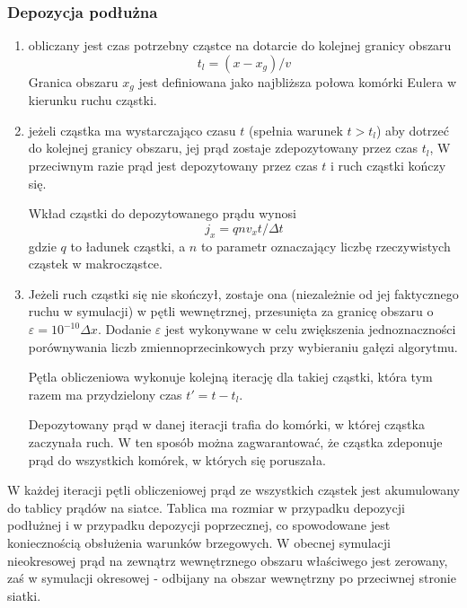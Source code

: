 \subsubsection{Depozycja podłużna} 
\begin{enumerate}
    \item{} obliczany jest czas potrzebny cząstce na dotarcie do kolejnej
    granicy obszaru
    \begin{equation}
        t_l = (x - x_g)/v
    \end{equation}
    Granica obszaru $x_g$ jest definiowana jako najbliższa połowa komórki Eulera w kierunku
    ruchu cząstki.
    \item
    \begin{itemize}
        \itemi{} jeżeli cząstka ma wystarczająco czasu $t$ (spełnia warunek $t > t_l$) aby
        dotrzeć do kolejnej granicy obszaru, jej prąd zostaje zdepozytowany przez czas $t_l$,
        \itemi{} W przeciwnym razie prąd jest depozytowany przez czas $t$ i ruch cząstki kończy się.
    \end{itemize}
    Wkład cząstki do depozytowanego prądu wynosi
    \begin{equation}
        j_x = q n v_x t/\Delta t
    \end{equation}
    gdzie $q$ to ładunek cząstki, a $n$ to parametr  oznaczający liczbę
    rzeczywistych cząstek w makrocząstce.

    \item{} Jeżeli ruch cząstki się nie skończył, zostaje ona (niezależnie od
    jej faktycznego ruchu w symulacji) w pętli wewnętrznej, 
    przesunięta za granicę obszaru o $\varepsilon =
    10^{-10} \Delta x$. Dodanie $\varepsilon$ jest wykonywane w celu zwiększenia
    jednoznaczności porównywania liczb zmiennoprzecinkowych przy wybieraniu
    gałęzi algorytmu.

    Pętla obliczeniowa wykonuje kolejną iterację dla takiej cząstki, która tym razem
    ma przydzielony czas $t' = t - t_l$.

    Depozytowany prąd w danej iteracji trafia do komórki, w której cząstka zaczynała ruch. W ten sposób
    można zagwarantować, że cząstka zdeponuje prąd do wszystkich komórek, w których się poruszała.
\end{enumerate}

W każdej iteracji pętli obliczeniowej prąd ze wszystkich cząstek jest
akumulowany do tablicy prądów na siatce. Tablica ma rozmiar  w
przypadku depozycji podłużnej i  w przypadku depozycji poprzecznej,
co spowodowane jest koniecznością obsłużenia warunków brzegowych.  W obecnej
symulacji nieokresowej prąd na zewnątrz wewnętrznego obszaru właściwego
 jest zerowany, zaś w symulacji okresowej - odbijany na obszar
wewnętrzny po przeciwnej stronie siatki.

